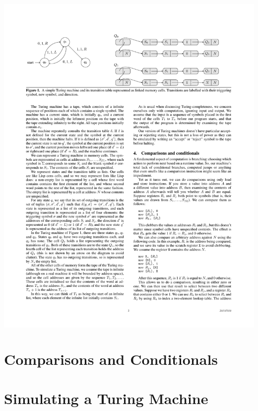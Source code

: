 \documentclass{beamer}
\begin{document}
\begin{frame}[fragile]
\frametitle{}

\begin{center}
\includegraphics[scale=0.5]{figures/TMrepresentation}
\end{center}
\end{frame}
\section{Comparisons and Conditionals}

%

\section{Simulating a Turing Machine}
\end{document}

